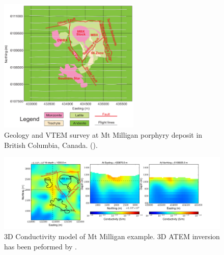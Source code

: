 \documentclass[letterpaper,11pt]{article}
\begin{document}
\begin{figure}[htb]
  \centering
  \includegraphics[width=0.6\textwidth]{figures/milligan_geo.png}
  \caption{Geology and VTEM survey at Mt Milligan porphyry deposit in British Columbia, Canada. (\cite{yang20143}).}
  \label{Fig:milligan_geology}
\end{figure}

\begin{figure}[htb]
  \centering
  \includegraphics[width=1.0\textwidth]{figures/sigma_est_field.png}
  \caption{3D Conductivity model of Mt Milligan example. 3D ATEM inversion has been peformed by \cite{yang20143}.}
  \label{Fig:milligan_sigma}
\end{figure}
\end{document}
